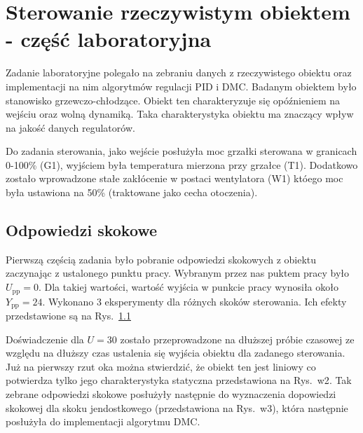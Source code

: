 \chapter{Sterowanie rzeczywistym obiektem - część laboratoryjna}

Zadanie laboratoryjne polegało na zebraniu danych z rzeczywistego obiektu oraz implementacji na nim algorytmów regulacji PID i DMC. Badanym obiektem było stanowisko grzewczo-chłodzące. Obiekt ten charakteryzuje się opóźnieniem na wejściu oraz wolną dynamiką. Taka charakterystyka obiektu ma znaczący wpływ na jakość danych regulatorów.

Do zadania sterowania, jako wejście posłużyła moc grzałki sterowana w granicach 0-100\% (G1), wyjściem była temperatura mierzona przy grzałce (T1). Dodatkowo zostało wprowadzone stałe zakłócenie w postaci wentylatora (W1) któego moc była ustawiona na 50\% (traktowane jako cecha otoczenia).

\section{Odpowiedzi skokowe}
Pierwszą częścią zadania było pobranie odpowiedzi skokowych z obiektu zaczynając z ustalonego punktu pracy. Wybranym przez nas puktem pracy było $U_\mathrm{pp}=0$. Dla takiej wartości, wartość wyjścia w punkcie pracy wynosiła około $Y_\mathrm{pp}=24$. Wykonano 3 eksperymenty dla różnych skoków sterowania. Ich efekty przedstawione są na Rys.~\ref{w1}

\begin{figure}

\centering
\caption{ }

\label{w1}
\end{figure}

Doświadczenie dla $U=30$ zostało przeprowadzone na dłuższej próbie czasowej ze względu na dłuższy czas ustalenia się wyjścia obiektu dla zadanego sterowania. Już na pierwszy rzut oka można stwierdzić, że obiekt ten jest liniowy co potwierdza tylko jego charakterystyka statyczna przedstawiona na Rys.~{w2}. Tak zebrane odpowiedzi skokowe posłużyły następnie do wyznaczenia dopowiedzi skokowej dla skoku jendostkowego (przedstawiona na Rys.~{w3}), która następnie posłużyła do implementacji algorytmu DMC.

\begin{figure}

\centering
\caption{}

\label{w2}
\end{figure}

